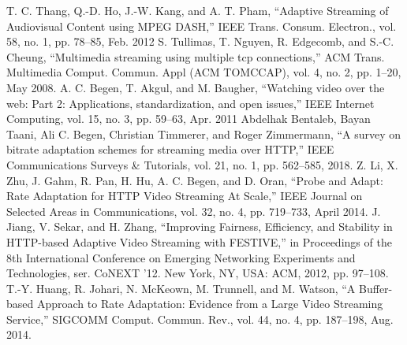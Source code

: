 \documentclass[journal]{IEEEtran}
\begin{document}
\begin{thebibliography}{1}

T. C. Thang, Q.-D. Ho, J.-W. Kang, and A. T. Pham, “Adaptive
Streaming of Audiovisual Content using MPEG DASH,” IEEE Trans.
Consum. Electron., vol. 58, no. 1, pp. 78–85, Feb. 2012
S. Tullimas, T. Nguyen, R. Edgecomb, and S.-C. Cheung, “Multimedia
streaming using multiple tcp connections,” ACM Trans. Multimedia
Comput. Commun. Appl (ACM TOMCCAP), vol. 4, no. 2, pp. 1–20,
May 2008.
A. C. Begen, T. Akgul, and M. Baugher, “Watching video over the web:
Part 2: Applications, standardization, and open issues,” IEEE Internet
Computing, vol. 15, no. 3, pp. 59–63, Apr. 2011
Abdelhak Bentaleb, Bayan Taani, Ali C. Begen, Christian Timmerer, and Roger
Zimmermann, “A survey on bitrate adaptation schemes for streaming media over HTTP,” IEEE Communications Surveys \& Tutorials, vol. 21, no. 1, pp. 562–585,
2018.
 Z. Li, X. Zhu, J. Gahm, R. Pan, H. Hu, A. C. Begen, and D. Oran,
“Probe and Adapt: Rate Adaptation for HTTP Video Streaming At
Scale,” IEEE Journal on Selected Areas in Communications, vol. 32,
no. 4, pp. 719–733, April 2014.
J. Jiang, V. Sekar, and H. Zhang, “Improving Fairness, Efficiency, and
Stability in HTTP-based Adaptive Video Streaming with FESTIVE,”
in Proceedings of the 8th International Conference on Emerging
Networking Experiments and Technologies, ser. CoNEXT ’12. New
York, NY, USA: ACM, 2012, pp. 97–108. 
 T.-Y. Huang, R. Johari, N. McKeown, M. Trunnell, and M. Watson,
“A Buffer-based Approach to Rate Adaptation: Evidence from a
Large Video Streaming Service,” SIGCOMM Comput. Commun.
Rev., vol. 44, no. 4, pp. 187–198, Aug. 2014. 


\end{thebibliography}
\end{document}
